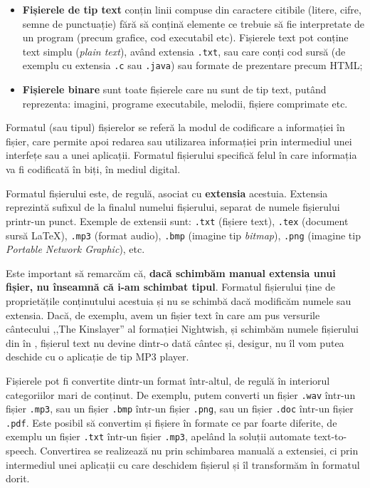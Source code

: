 \begin{itemize}
  \item \textbf{Fișierele de tip text} conțin linii compuse din caractere citibile (litere, cifre, semne de punctuație)
		fără să conțină elemente ce trebuie să fie interpretate de un
		program (precum grafice, cod executabil etc). Fișierele text
		pot conține text simplu (\textit{plain text}), având extensia
                \texttt{.txt}, sau care conți cod sursă (de exemplu cu extensia \texttt{.c} sau \texttt{.java})
		sau formate de prezentare precum HTML;
	\item \textbf{Fișierele binare} sunt toate fișierele care nu sunt de tip
		text, putând reprezenta: imagini, programe executabile, melodii,
		fișiere comprimate etc.
\end{itemize}

Formatul (sau tipul) fișierelor se referă la modul de
codificare a informației în fișier, care permite apoi redarea sau utilizarea
informației prin intermediul unei interfețe sau a unei aplicații. Formatul
fișierului specifică felul în care informația va fi codificată în biți, în
mediul digital.

Formatul fișierului este, de regulă, asociat cu \textbf{extensia} acestuia.
Extensia reprezintă sufixul de la finalul numelui fișierului, separat de numele
fișierului printr-un punct. Exemple de extensii sunt: \texttt{.txt}
(fișiere text), \texttt{.tex} (document sursă LaTeX), \texttt{.mp3} (format audio), \texttt{.bmp} (imagine tip
\textit{bitmap}), \texttt{.png} (imagine tip \textit{Portable Network Graphic}), etc.

Este important să remarcăm că, \textbf{dacă schimbăm manual extensia unui
fișier, nu înseamnă că i-am schimbat tipul}. Formatul fișierului ține de
proprietățile conținutului acestuia și nu se schimbă dacă modificăm numele sau
extensia. Dacă, de exemplu, avem un fișier text în care am pus versurile
cântecului ,,The Kinslayer'' al formației Nightwish, și schimbăm numele
fișierului din  în , fișierul text nu devine
dintr-o dată cântec și, desigur, nu îl vom putea deschide cu o aplicație de tip MP3
player.

Fișierele pot fi convertite dintr-un format într-altul, de regulă în interiorul
categoriilor mari de conținut. De exemplu, putem converti un fișier \texttt{.wav} într-un fișier \texttt {.mp3},
sau un fișier \texttt{.bmp} într-un fișier \texttt{.png}, sau un fișier \texttt{.doc} într-un fișier \texttt{.pdf}. Este posibil să convertim și
fișiere în formate ce par foarte diferite, de exemplu un fișier \texttt{.txt} într-un fișier \texttt{.mp3},
apelând la soluții automate text-to-speech. Convertirea se realizează
nu prin schimbarea manuală a extensiei, ci prin intermediul unei aplicații cu
care deschidem fișierul și îl transformăm în formatul dorit.

